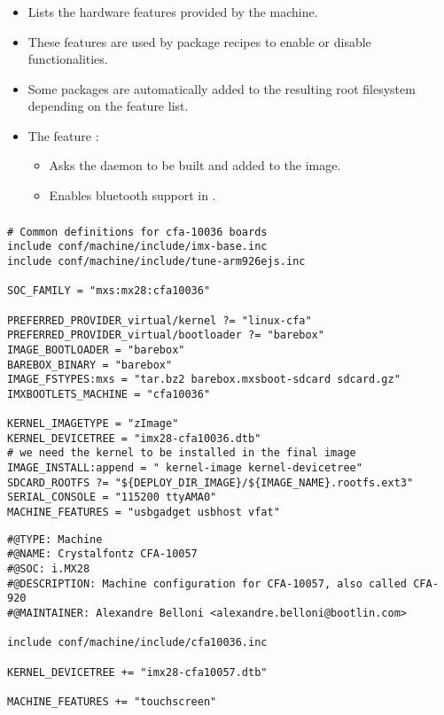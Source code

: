 \begin{frame}
  \frametitle{}
  \begin{itemize}
    \item Lists the hardware features provided by the machine.
    \item These features are used by package recipes to enable or
      disable functionalities.
    \item Some packages are automatically added to the resulting root
    filesystem depending on the feature list.
    \item The feature :
      \begin{itemize}
        \item Asks the  daemon to be built and added to
          the image.
        \item Enables bluetooth support in .
      \end{itemize}
  \end{itemize}
\end{frame}

\begin{frame}[fragile]
  \frametitle{}
  \begin{block}{}
    \begin{verbatim}
# Common definitions for cfa-10036 boards
include conf/machine/include/imx-base.inc
include conf/machine/include/tune-arm926ejs.inc

SOC_FAMILY = "mxs:mx28:cfa10036"

PREFERRED_PROVIDER_virtual/kernel ?= "linux-cfa"
PREFERRED_PROVIDER_virtual/bootloader ?= "barebox"
IMAGE_BOOTLOADER = "barebox"
BAREBOX_BINARY = "barebox"
IMAGE_FSTYPES:mxs = "tar.bz2 barebox.mxsboot-sdcard sdcard.gz"
IMXBOOTLETS_MACHINE = "cfa10036"

KERNEL_IMAGETYPE = "zImage"
KERNEL_DEVICETREE = "imx28-cfa10036.dtb"
# we need the kernel to be installed in the final image
IMAGE_INSTALL:append = " kernel-image kernel-devicetree"
SDCARD_ROOTFS ?= "${DEPLOY_DIR_IMAGE}/${IMAGE_NAME}.rootfs.ext3"
SERIAL_CONSOLE = "115200 ttyAMA0"
MACHINE_FEATURES = "usbgadget usbhost vfat"
    \end{verbatim}
  \end{block}
\end{frame}

\begin{frame}[fragile]{}
  \begin{block}{}
    \begin{verbatim}
#@TYPE: Machine
#@NAME: Crystalfontz CFA-10057
#@SOC: i.MX28
#@DESCRIPTION: Machine configuration for CFA-10057, also called CFA-920
#@MAINTAINER: Alexandre Belloni <alexandre.belloni@bootlin.com>

include conf/machine/include/cfa10036.inc

KERNEL_DEVICETREE += "imx28-cfa10057.dtb"

MACHINE_FEATURES += "touchscreen"
    \end{verbatim}
  \end{block}
\end{frame}

